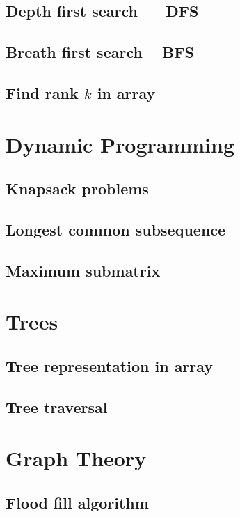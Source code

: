 \documentclass[a4paper]{article}
\begin{document}
\subsection{Depth first search --- DFS}

\subsection{Breath first search -- BFS}

\subsection{Find rank $k$ in array}

\section{Dynamic Programming}

\subsection{Knapsack problems}

\subsection{Longest common subsequence}

\subsection{Maximum submatrix}

\section{Trees}

\subsection{Tree representation in array}

\subsection{Tree traversal}

\section{Graph Theory}

\subsection{Flood fill algorithm}
\end{document}
